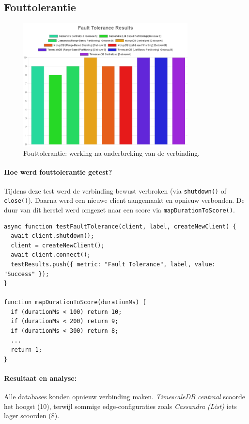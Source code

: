 \subsection{Fouttolerantie}

\begin{figure}[H]
    \centering
    \includegraphics[width=0.8\textwidth]{charts/Fault_Tolerance.png}
    \caption{Fouttolerantie: werking na onderbreking van de verbinding.}
    \label{fig:fault-tolerance-comparison}
\end{figure}

\paragraph{Hoe werd fouttolerantie getest?}
Tijdens deze test werd de verbinding bewust verbroken (via \texttt{shutdown()} of \texttt{close()}). Daarna werd een nieuwe client aangemaakt en opnieuw verbonden. De duur van dit herstel werd omgezet naar een score via \texttt{mapDurationToScore()}.

\begin{verbatim}
async function testFaultTolerance(client, label, createNewClient) {
  await client.shutdown();
  client = createNewClient();
  await client.connect();
  testResults.push({ metric: "Fault Tolerance", label, value: "Success" });
}

function mapDurationToScore(durationMs) {
  if (durationMs < 100) return 10;
  if (durationMs < 200) return 9;
  if (durationMs < 300) return 8;
  ...
  return 1;
}
\end{verbatim}

\paragraph{Resultaat en analyse:}
Alle databases konden opnieuw verbinding maken. \textit{TimescaleDB centraal} scoorde het hoogst (10), terwijl sommige edge-configuraties zoals \textit{Cassandra (List)} iets lager scoorden (8).

